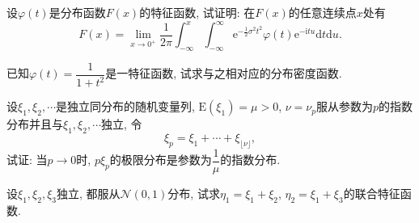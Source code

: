 \begin{yyEx}
	设$\varphi(t)$是分布函数$F(x)$的特征函数, 试证明: 在$F(x)$的任意连续点$x$处有
	\begin{equation}
		F(x) = \lim_{x\to 0^+}\frac{1}{2\pi}\int_{-\infty}^{x}\int_{-\infty}^{\infty}\mathrm{e}^{-\frac{1}{2}\sigma^2t^2}\varphi(t)\mathrm{e}^{-\mathrm{i}tu}\mathrm{d}t\mathrm{d}u.
	\end{equation}
\end{yyEx}

\begin{yyEx}
	已知$\varphi(t) = \dfrac{1}{1+t^2}$是一特征函数, 试求与之相对应的分布密度函数.
\end{yyEx}

\begin{yyEx}
	设$\xi_1,\xi_2,\cdots$是独立同分布的随机变量列, $\mathrm{E}(\xi_1) = \mu > 0$, $\nu = \nu_p$服从参数为$p$的指数分布并且与$\xi_1,\xi_2,\cdots$独立, 令
	\begin{equation}
		\xi_p = \xi_1 + \cdots + \xi_{\lfloor \nu\rfloor},
	\end{equation}
	试证: 当$p\to 0$时, $p\xi_p$的极限分布是参数为$\dfrac{1}{\mu}$的指数分布.
\end{yyEx}

\begin{yyEx}
	设$\xi_1,\xi_2,\xi_3$独立, 都服从$\mathcal{N}(0,1)$分布, 试求$\eta_1 = \xi_1 + \xi_2$, $\eta_2 = \xi_1 + \xi_3$的联合特征函数.
\end{yyEx}














